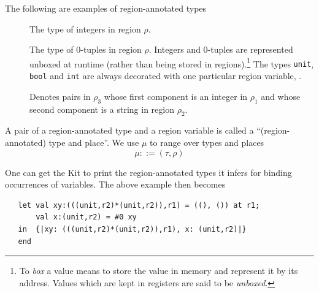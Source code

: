 \documentclass[12pt]{book}
\begin{document}
The following are examples of region-annotated types
\begin{description}
\item[] The type of integers in region $\rho$. 
\item[] The type of 0-tuples in region $\rho$. 
Integers and
0-tuples are represented unboxed at runtime 
(rather than being stored in regions).\footnote{To {\em box}
a value means to store the value in memory and represent it by its address. 
Values which are kept in registers are said to be {\em unboxed}.}  The types
{\tt unit}, {\tt bool} and {\tt int} are always decorated 
with one particular region variable,  . 
\item[] Denotes
pairs in $\rho_3$ whose first component is an integer in $\rho_1$ and whose second
component is a string in region $\rho_2$. 
\end{description}
A pair of a region-annotated type and a region variable is called a
``(region-annotated) type and place''.  We use $\mu$ to range over
types and places
$$\mu::=(\tau,\rho)$$

One can get the Kit to print the region-annotated types it infers
for binding occurrences of variables. 
The above example then becomes
\begin{verbatim}
   let val xy:(((unit,r2)*(unit,r2)),r1) = ((), ()) at r1; 
       val x:(unit,r2) = #0 xy
   in  {|xy: (((unit,r2)*(unit,r2)),r1), x: (unit,r2)|}
   end 
\end{verbatim}
\end{document}
